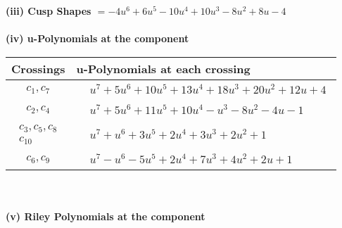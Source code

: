 \documentclass[1p]{elsarticle_modified}
\theoremstyle{definition}
\begin{document}
\flushleft \textbf{(iii) Cusp Shapes $= -4 u^6+6 u^5-10 u^4+10 u^3-8 u^2+8 u-4$}\\~\\
\newpage\renewcommand{\arraystretch}{1}
\flushleft \textbf{(iv) u-Polynomials at the component}\newline \\
\begin{tabular}{m{50pt}|m{274pt}}
Crossings & \hspace{64pt}u-Polynomials at each crossing \\
\hline $$\begin{aligned}c_{1},c_{7}\end{aligned}$$&$\begin{aligned}
&u^7+5 u^6+10 u^5+13 u^4+18 u^3+20 u^2+12 u+4
\end{aligned}$\\
\hline $$\begin{aligned}c_{2},c_{4}\end{aligned}$$&$\begin{aligned}
&u^7+5 u^6+11 u^5+10 u^4- u^3-8 u^2-4 u-1
\end{aligned}$\\
\hline $$\begin{aligned}c_{3},c_{5},c_{8}\\c_{10}\end{aligned}$$&$\begin{aligned}
&u^7+u^6+3 u^5+2 u^4+3 u^3+2 u^2+1
\end{aligned}$\\
\hline $$\begin{aligned}c_{6},c_{9}\end{aligned}$$&$\begin{aligned}
&u^7- u^6-5 u^5+2 u^4+7 u^3+4 u^2+2 u+1
\end{aligned}$\\
\hline
\end{tabular}\\~\\
\newpage\renewcommand{\arraystretch}{1}
\flushleft \textbf{(v) Riley Polynomials at the component}\newline \\
\end{document}
